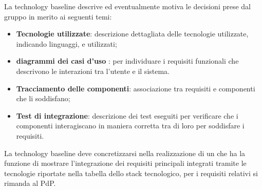 La technology baseline descrive ed eventualmente motiva le decisioni prese dal gruppo \Gruppo{} in merito ai seguenti temi:

\begin{itemize}
    \item \textbf{Tecnologie utilizzate}: descrizione dettagliata delle tecnologie utilizzate, indicando linguaggi,   e  utilizzati;
    \item \textbf{diagrammi dei casi d'uso }: per individuare i requisiti funzionali che descrivono le interazioni tra l'utente e il sistema.
    \item \textbf{Tracciamento delle componenti}: associazione tra requisiti e componenti che li soddisfano;
    \item \textbf{Test di integrazione}: descrizione dei test eseguiti per verificare che i componenti interagiscano in maniera corretta tra di loro per soddisfare i requisiti.
\end{itemize}

La technology baseline deve concretizzarsi nella realizzazione di un \emph{} che ha la funzione di mostrare l'integrazione dei requisiti principali integrati tramite le tecnologie riportate nella tabella dello stack tecnologico, per i requisiti relativi si rimanda al PdP.
